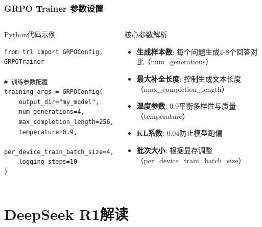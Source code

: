 \documentclass[8pt,aspectratio=169]{beamer}
\begin{document}
\begin{frame}[fragile]
    \frametitle{GRPO Trainer 参数设置}
    \begin{columns}[T]
        \begin{block}{Python代码示例}
            \begin{lstlisting}[basicstyle=\small]
from trl import GRPOConfig, GRPOTrainer

# 训练参数配置
training_args = GRPOConfig(
    output_dir="my_model",
    num_generations=4,
    max_completion_length=256,
    temperature=0.9,
    per_device_train_batch_size=4,
    logging_steps=10
)
            \end{lstlisting}
        \end{block}
        
        \begin{block}{核心参数解析}
            \begin{itemize}
                \item \textbf{生成样本数}: 每个问题生成4-8个回答对比（num\_generations）
                \item \textbf{最大补全长度}: 控制生成文本长度（max\_completion\_length）
                \item \textbf{温度参数}: 0.9平衡多样性与质量（temperature）
                \item \textbf{KL系数}: 0.04防止模型跑偏
                \item \textbf{批次大小}: 根据显存调整（per\_device\_train\_batch\_size）
            \end{itemize}
        \end{block}


    \end{columns}
\end{frame}

\section{DeepSeek R1解读}
\end{document}
